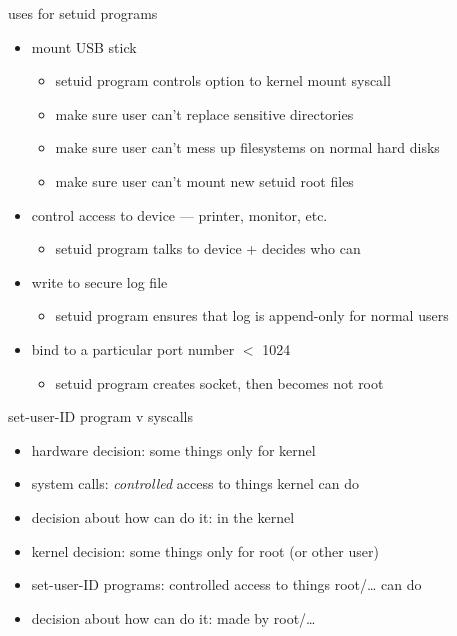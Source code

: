 \begin{frame}{uses for setuid programs}
\begin{itemize}
    \item mount USB stick
        \begin{itemize}
        \item setuid program controls option to kernel mount syscall
        \item make sure user can't replace sensitive directories
        \item make sure user can't mess up filesystems on normal hard disks
        \item make sure user can't mount new setuid root files
        \end{itemize}
    \item control access to device --- printer, monitor, etc.
        \begin{itemize}
        \item setuid program talks to device + decides who can
        \end{itemize}
    \item write to secure log file
        \begin{itemize}
        \item setuid program ensures that log is append-only for normal users
        \end{itemize}
    \item bind to a particular port number $<$ 1024
        \begin{itemize}
        \item setuid program creates socket, then becomes not root
        \end{itemize}
\end{itemize}
\end{frame}

\begin{frame}{set-user-ID program v syscalls}
\begin{itemize}
\item hardware decision: some things only for kernel
\item system calls: \textit{controlled} access to things kernel can do
\item decision about how can do it: in the kernel
\vspace{.5cm}
\item kernel decision: some things only for root (or other user)
\item set-user-ID programs: controlled access to things root/\ldots{} can do
\item decision about how can do it: made by root/\ldots
\end{itemize}
\end{frame}

